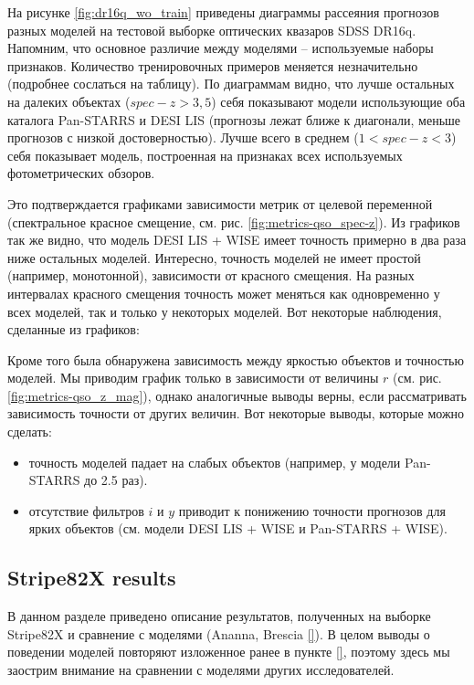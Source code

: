 \documentclass[fleqn,usenatbib]{mnras}
\begin{document}
На рисунке \ref{fig:dr16q_wo_train} приведены диаграммы рассеяния прогнозов разных моделей на тестовой выборке оптических квазаров SDSS DR16q. Напомним, что основное различие между моделями -- используемые наборы признаков. Количество тренировочных примеров меняется незначительно (подробнее сослаться на таблицу). По диаграммам видно, что  лучше остальных на далеких объектах ($spec-z > 3,5$) себя показывают модели использующие оба каталога Pan-STARRS и DESI LIS (прогнозы лежат ближе к диагонали, меньше прогнозов с низкой достоверностью). Лучше всего в среднем ($1 < spec-z < 3$) себя показывает модель, построенная на признаках всех используемых фотометрических обзоров.

Это подтверждается графиками зависимости метрик от целевой переменной (спектральное красное смещение, см. рис. \ref{fig:metrics-qso_spec-z}). Из графиков так же видно, что модель DESI LIS + WISE имеет точность примерно в два раза ниже остальных моделей. Интересно, точность моделей не имеет простой (например, монотонной), зависимости от красного смещения. На разных интервалах красного смещения точность может меняться как одновременно у всех моделей, так и только у некоторых моделей. Вот некоторые наблюдения, сделанные из графиков:

Кроме того была обнаружена зависимость между яркостью объектов и точностью моделей. Мы приводим график только в зависимости от величины $r$ (см. рис. \ref{fig:metrics-qso_z_mag}), однако аналогичные выводы верны, если рассматривать зависимость точности от других величин. Вот некоторые выводы, которые можно сделать:
\begin{itemize}
    \item точность моделей падает на слабых объектов (например, у модели Pan-STARRS до 2.5 раз).
    \item отсутствие фильтров $i$ и $y$ приводит к понижению точности прогнозов для ярких объектов (см. модели DESI LIS + WISE и Pan-STARRS + WISE).
\end{itemize}

\subsection{Stripe82X results}\label{subsec:s82x_results}

В данном разделе приведено описание результатов, полученных на выборке Stripe82X и сравнение с моделями (Ananna, Brescia \ref{}). В целом выводы о поведении моделей повторяют изложенное ранее в пункте \ref{}, поэтому здесь мы заострим внимание на сравнении с моделями других исследователей.
\end{document}
